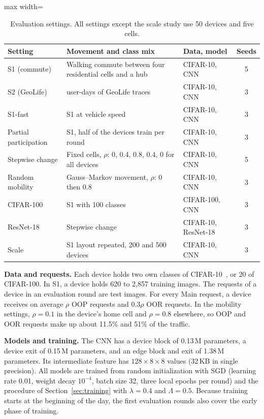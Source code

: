 \begin{table}[t]
\centering
\caption{Evaluation settings. All settings except the scale study use 50 devices and five cells.}
\label{tab:settings}
\begin{adjustbox}{max width=\columnwidth}
\begin{tabular}{l>{\raggedright\arraybackslash}p{4.3cm}lc}
\toprule
Setting & Movement and class mix & Data, model & Seeds \\
\midrule
S1 (commute) & Walking commute between four residential cells and a hub & CIFAR-10, CNN & 5 \\
S2 (GeoLife) & 50 user-days of GeoLife traces & CIFAR-10, CNN & 3 \\
S1-fast & S1 at vehicle speed & CIFAR-10, CNN & 3 \\
Partial participation & S1, half of the devices train per round & CIFAR-10, CNN & 3 \\
Stepwise change & Fixed cells, $\rho$: 0, 0.4, 0.8, 0.4, 0 for all devices & CIFAR-10, CNN & 5 \\
Random mobility & Gauss--Markov movement, $\rho$: 0 then 0.8 & CIFAR-10, CNN & 3 \\
CIFAR-100 & S1 with 100 classes & CIFAR-100, CNN & 3 \\
ResNet-18 & Stepwise change & CIFAR-10, ResNet-18 & 3 \\
Scale & S1 layout repeated, 200 and 500 devices & CIFAR-10, CNN & 3 \\
\bottomrule
\end{tabular}
\end{adjustbox}
\end{table}

\textbf{Data and requests.} Each device holds two own classes of CIFAR-10~\cite{krizhevsky2009cifar}, or 20 of CIFAR-100. In S1, a device holds 620 to 2,857 training images. The requests of a device in an evaluation round are test images. For every Main request, a device receives on average $\rho$ OOP requests and $0.3\rho$ OOR requests. In the mobility settings, $\rho=0.1$ in the device's home cell and $\rho=0.8$ elsewhere, so OOP and OOR requests make up about 11.5\% and 51\% of the traffic.

\textbf{Models and training.} The CNN has a device block of 0.13\,M parameters, a device exit of 0.15\,M parameters, and an edge block and exit of 1.38\,M parameters. Its intermediate feature has $128\times8\times8$ values (32\,KB in single precision). All models are trained from random initialization with SGD (learning rate 0.01, weight decay $10^{-4}$, batch size 32, three local epochs per round) and the procedure of Section~\ref{sec:training} with $\lambda=0.4$ and $\Lambda=0.5$. Because training starts at the beginning of the day, the first evaluation rounds also cover the early phase of training.

